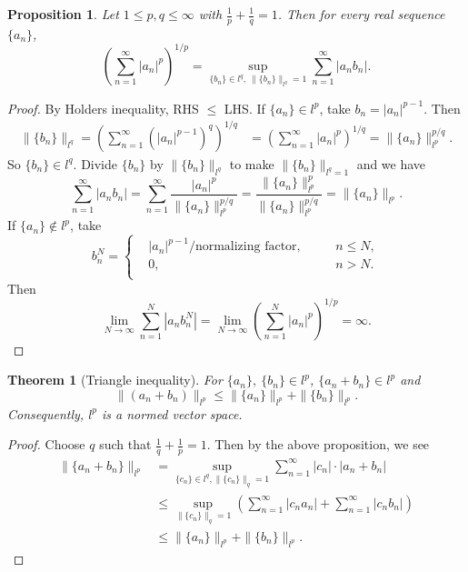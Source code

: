 \documentclass[12pt]{article}
\theoremstyle{plain}
\newtheorem{thm}{Theorem}
\newtheorem*{prop}{Proposition}
\theoremstyle{definition}
\begin{document}
\begin{prop}
    Let $1\leq p, q\leq \infty$ with $\frac{1}{p} + \frac{1}{q} = 1$.
    Then for every real sequence $\{a_n\}$,
    \[\left(\sum_{n=1}^\infty |a_n|^p\right)^{1/p} = \sup_{\{b_n\}\in l^q,\ \|\{b_n\}\|_{l^q} = 1} \sum_{n=1}^\infty
    |a_nb_n|.\]
\end{prop}
\begin{proof}
    By Holders inequality, RHS $\leq$ LHS\@.
    If $\{a_n\}\in l^p$, take $b_n = |a_n|^{p-1}$.
    Then
    \[\begin{aligned}
            \|\{b_n\}\|_{l^q} = \left(\sum_{n=1}^\infty \left(|a_n|^{p-1}\right)^q\right)^{1/q} &= \left(\sum_{n=1}^\infty
            |a_n|^p\right)^{1/q} = \|\{a_n\}\|_{l^p}^{p/q}.
    \end{aligned}\]
    So $\{b_n\}\in l^q$.
    Divide $\{b_n\}$ by $\|\{b_n\}\|_{l^q}$ to make $\|\{b_n\}\|_{l^q=1}$ and
    we have
    \[
        \sum_{n=1}^\infty |a_nb_n| = \sum_{n=1}^\infty \frac{|a_n|^p}{\|\{a_n\}\|_{l^p}^{p/q}} =
        \frac{\|\{a_n\}\|_{l^p}^p}{\|\{a_n\}\|_{l^p}^{p/q}} = \|\{a_n\}\|_{l^p}.
    \]
    If $\{a_n\}\notin l^p$, take
    \[b_n^N=\left\{
            \begin{aligned}
                &|a_n|^{p-1}/\text{normalizing factor},\quad&& n\leq N,\\
                &0,&&n>N.\\
        \end{aligned}
    \right.\]
    Then
    \[
        \lim_{N\rightarrow\infty}\sum_{n=1}^N |a_nb_n^N| = \lim_{N\rightarrow\infty}\left(\sum_{n=1}^N
        |a_n|^p\right)^{1/p} = \infty.
    \]
\end{proof}

\begin{thm}[Triangle inequality]
    For $\{a_n\},\ \{b_n\}\in l^p$, $\{a_n+b_n\}\in l^p$ and 
    \[
        \|(a_n+b_n)\|_{l^p} \leq \|\{a_n\}\|_{l^p} + \|\{b_n\}\|_{l^p}.
    \]
    Consequently, $l^p$ is a normed vector space.
\end{thm}
\begin{proof}
    Choose $q$ such that $\frac{1}{q} + \frac{1}{p} = 1$.
    Then by the above proposition, we see
    \[
        \begin{aligned}
            \|\{a_n+b_n\}\|_{l^p} 
            &= \sup_{\{c_n\}\in l^q, \|\{c_n\}\|_q=1} \sum_{n=1}^\infty |c_n|\cdot |a_n+b_n|\\
            &\leq \sup_{\|\{c_n\}\|_q = 1} \left(\sum_{n=1}^\infty |c_n a_n| + \sum_{n=1}^\infty |c_nb_n|\right)\\
            &\leq \|\{a_n\}\|_{l^p} + \|\{b_n\}\|_{l^p}.
        \end{aligned}
    \]
\end{proof}
\end{document}
